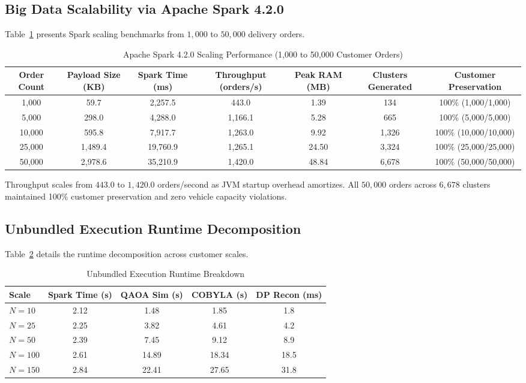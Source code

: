 \documentclass[journal,10pt]{IEEEtran}
\begin{document}
\subsection{Big Data Scalability via Apache Spark 4.2.0}
Table~\ref{tab:spark_scaling} presents Spark scaling benchmarks from $1,000$ to $50,000$ delivery orders.

\begin{table}[t]
\caption{Apache Spark 4.2.0 Scaling Performance (1,000 to 50,000 Customer Orders)}
\label{tab:spark_scaling}
\centering
\begin{tabular}{ccccccc}
\toprule
\textbf{Order Count} & \textbf{Payload Size (KB)} & \textbf{Spark Time (ms)} & \textbf{Throughput (orders/s)} & \textbf{Peak RAM (MB)} & \textbf{Clusters Generated} & \textbf{Customer Preservation} \\
\midrule
1,000  & 59.7   & 2,257.5  & 443.0   & 1.39  & 134   & 100\% (1,000/1,000) \\
5,000  & 298.0  & 4,288.0  & 1,166.1 & 5.28  & 665   & 100\% (5,000/5,000) \\
10,000 & 595.8  & 7,917.7  & 1,263.0 & 9.92  & 1,326 & 100\% (10,000/10,000) \\
25,000 & 1,489.4& 19,760.9 & 1,265.1 & 24.50 & 3,324 & 100\% (25,000/25,000) \\
50,000 & 2,978.6& 35,210.9 & 1,420.0 & 48.84 & 6,678 & 100\% (50,000/50,000) \\
\bottomrule
\end{tabular}
\end{table}

Throughput scales from $443.0$ to $1,420.0$ orders/second as JVM startup overhead amortizes. All $50,000$ orders across $6,678$ clusters maintained 100\% customer preservation and zero vehicle capacity violations.

\subsection{Unbundled Execution Runtime Decomposition}
Table~\ref{tab:timing} details the runtime decomposition across customer scales.

\begin{table}[htbp]
\caption{Unbundled Execution Runtime Breakdown}
\label{tab:timing}
\centering
\begin{tabular}{lcccc}
\toprule
\textbf{Scale} & \textbf{Spark Time (s)} & \textbf{QAOA Sim (s)} & \textbf{COBYLA (s)} & \textbf{DP Recon (ms)} \\
\midrule
$N=10$  & 2.12 & 1.48  & 1.85  & 1.8 \\
$N=25$  & 2.25 & 3.82  & 4.61  & 4.2 \\
$N=50$  & 2.39 & 7.45  & 9.12  & 8.9 \\
$N=100$ & 2.61 & 14.89 & 18.34 & 18.5 \\
$N=150$ & 2.84 & 22.41 & 27.65 & 31.8 \\
\bottomrule
\end{tabular}
\end{table}
\end{document}
